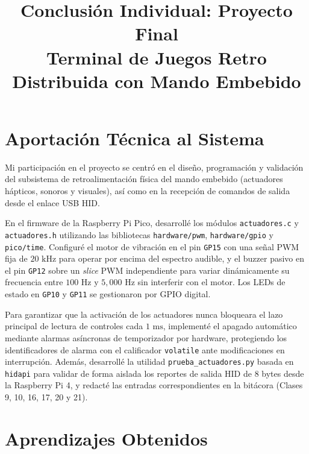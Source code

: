 \documentclass[conference]{IEEEtran}
\begin{document}
\title{Conclusión Individual: Proyecto Final \\
\large Terminal de Juegos Retro Distribuida con Mando Embebido}

\author{
}

\maketitle

\section*{Aportación Técnica al Sistema}

Mi participación en el proyecto se centró en el diseño, programación y validación del subsistema de retroalimentación física del mando embebido (actuadores hápticos, sonoros y visuales), así como en la recepción de comandos de salida desde el enlace USB HID.

En el firmware de la Raspberry Pi Pico, desarrollé los módulos \texttt{actuadores.c} y \texttt{actuadores.h} utilizando las bibliotecas \texttt{hardware/pwm}, \texttt{hardware/gpio} y \texttt{pico/time}. Configuré el motor de vibración en el pin \texttt{GP15} con una señal PWM fija de $20\text{ kHz}$ para operar por encima del espectro audible, y el buzzer pasivo en el pin \texttt{GP12} sobre un \textit{slice} PWM independiente para variar dinámicamente su frecuencia entre $100\text{ Hz}$ y $5{,}000\text{ Hz}$ sin interferir con el motor. Los LEDs de estado en \texttt{GP10} y \texttt{GP11} se gestionaron por GPIO digital.

Para garantizar que la activación de los actuadores nunca bloqueara el lazo principal de lectura de controles cada $1\text{ ms}$, implementé el apagado automático mediante alarmas asíncronas de temporizador por hardware, protegiendo los identificadores de alarma con el calificador \texttt{volatile} ante modificaciones en interrupción. Además, desarrollé la utilidad \texttt{prueba\_actuadores.py} basada en \texttt{hidapi} para validar de forma aislada los reportes de salida HID de 8 bytes desde la Raspberry Pi 4, y redacté las entradas correspondientes en la bitácora (Clases 9, 10, 16, 17, 20 y 21).

\section*{Aprendizajes Obtenidos}
\end{document}
